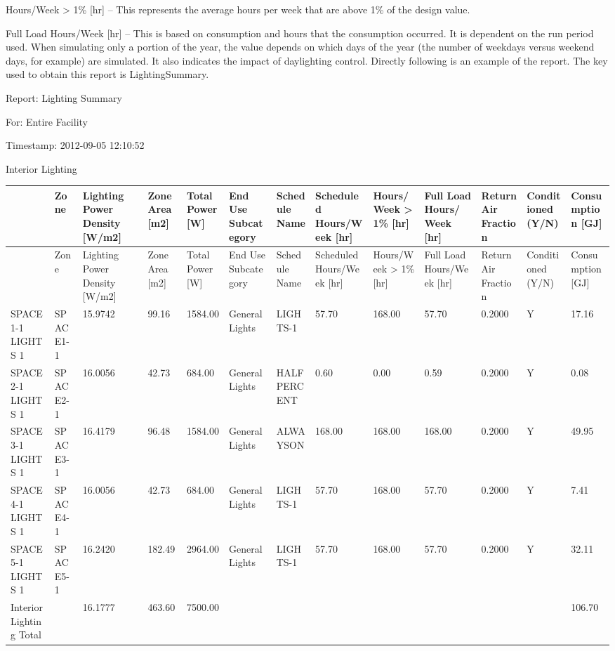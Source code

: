 Hours/Week \textgreater{} 1\% {[}hr{]} -- This represents the average hours per week that are above 1\% of the design value.

Full Load Hours/Week {[}hr{]} -- This is based on consumption and hours that the consumption occurred. It is dependent on the run period used. When simulating only a portion of the year, the value depends on which days of the year (the number of weekdays versus weekend days, for example) are simulated. It also indicates the impact of daylighting control. Directly following is an example of the report. The key used to obtain this report is LightingSummary.

Report: Lighting Summary

For: Entire Facility

Timestamp: 2012-09-05 12:10:52

Interior Lighting

{\scriptsize
\begin{longtable}[c]{>{\raggedright}p{0.46in}>{\raggedright}p{0.46in}>{\raggedright}p{0.46in}>{\raggedright}p{0.46in}>{\raggedright}p{0.46in}>{\raggedright}p{0.46in}>{\raggedright}p{0.46in}>{\raggedright}p{0.46in}>{\raggedright}p{0.46in}>{\raggedright}p{0.46in}>{\raggedright}p{0.46in}>{\raggedright}p{0.46in}>{\raggedright}p{0.46in}}
\toprule 
 & Zone & Lighting Power Density [W/m2] & Zone Area [m2] & Total Power [W] & End Use Subcategory & Schedule Name & Scheduled Hours/Week [hr] & Hours/Week  >  1\% [hr] & Full Load Hours/Week [hr] & Return Air Fraction & Conditioned (Y/N) & Consumption [GJ] \tabularnewline
\midrule
\endfirsthead

\toprule 
 & Zone & Lighting Power Density [W/m2] & Zone Area [m2] & Total Power [W] & End Use Subcategory & Schedule Name & Scheduled Hours/Week [hr] & Hours/Week  >  1\% [hr] & Full Load Hours/Week [hr] & Return Air Fraction & Conditioned (Y/N) & Consumption [GJ] \tabularnewline
\midrule
\endhead

SPACE1-1 LIGHTS 1 & SPACE1-1 & 15.9742 & 99.16 & 1584.00 & GeneralLights & LIGHTS-1 & 57.70 & 168.00 & 57.70 & 0.2000 & Y & 17.16 \tabularnewline
SPACE2-1 LIGHTS 1 & SPACE2-1 & 16.0056 & 42.73 & 684.00 & GeneralLights & HALFPERCENT & 0.60 & 0.00 & 0.59 & 0.2000 & Y & 0.08 \tabularnewline
SPACE3-1 LIGHTS 1 & SPACE3-1 & 16.4179 & 96.48 & 1584.00 & GeneralLights & ALWAYSON & 168.00 & 168.00 & 168.00 & 0.2000 & Y & 49.95 \tabularnewline
SPACE4-1 LIGHTS 1 & SPACE4-1 & 16.0056 & 42.73 & 684.00 & GeneralLights & LIGHTS-1 & 57.70 & 168.00 & 57.70 & 0.2000 & Y & 7.41 \tabularnewline
SPACE5-1 LIGHTS 1 & SPACE5-1 & 16.2420 & 182.49 & 2964.00 & GeneralLights & LIGHTS-1 & 57.70 & 168.00 & 57.70 & 0.2000 & Y & 32.11 \tabularnewline
Interior Lighting Total & ~ & 16.1777 & 463.60 & 7500.00 & ~ & ~ & ~ & ~ & ~ & ~ & ~ & 106.70 \tabularnewline
\bottomrule
\end{longtable}}

